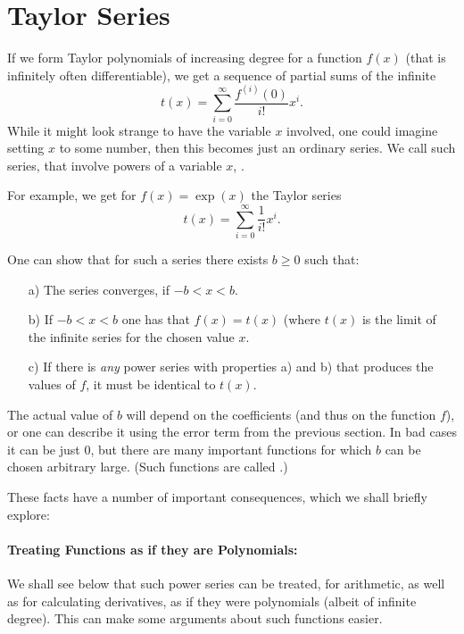 \section{Taylor Series}
\label{sectaylors}

If we form Taylor polynomials of increasing degree for a function $f(x)$
(that is infinitely often differentiable),
we get a sequence of partial sums of the infinite
\[
t(x)=\sum_{i=0}^\infty\frac{f^{(i)}(0)}{i!} x^i.
\]
While it might look strange to have the variable $x$ involved, one could
imagine setting $x$ to some number, then this becomes just an ordinary
series. We call such series, that involve powers of a variable $x$,
.

For example, we get for $f(x)=\exp(x)$ the Taylor series
\[
t(x)=\sum_{i=0}^\infty\frac{1}{i!} x^i.
\]

One can show that for such a series there exists $b\ge 0$ such that:
\begin{itemize}
\item[a)]
The
series converges, if $-b<x<b$.
\item[b)]
If $-b<x<b$ one has that $f(x)=t(x)$ (where $t(x)$ is the limit of the
infinite series for the chosen value $x$.
\item[c)] If there is {\em any} power series with properties a) and b) that
produces the values of $f$, it must be identical to $t(x)$.
\end{itemize}
The actual value of $b$ will depend on the
coefficients (and thus on the function $f$), or one can describe it using
the error term from the previous section.
In bad cases it can be just $0$, but there are many important functions for
which $b$ can be chosen arbitrary large. (Such functions are called
.)
\medskip

These facts have a number of important consequences, which we shall briefly
explore:
\paragraph{Treating Functions as if they are Polynomials:}
We shall see below that such power series can be treated, for arithmetic, as
well as for calculating derivatives, as if they were polynomials (albeit of
infinite degree). This can make some arguments about such functions easier.

